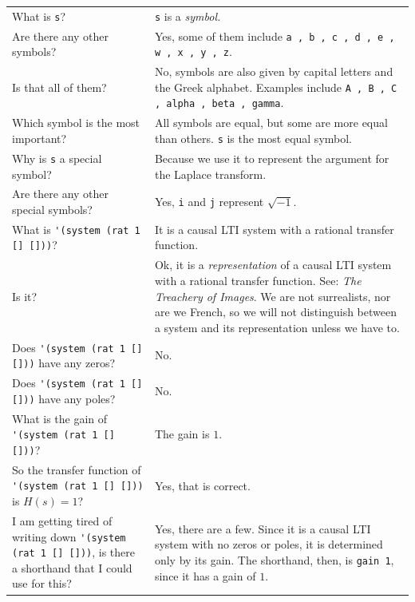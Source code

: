 \documentclass[11pt,letter]{article}
\begin{document}
\begin{longtable}{ p{} p{} }
  \toprule
  \toprule
  What is \lstinline!s!?
  &
  \lstinline!s! is a \emph{symbol.} \\

  Are there any other symbols?
  &
  Yes, some of them include \lstinline!a , b , c , d , e , w , x , y , z!. \\

  Is that all of them?
  &
  No, symbols are also given by capital letters and the Greek alphabet. Examples include \lstinline!A , B , C , alpha , beta , gamma!. \\

  Which symbol is the most important?
  &
  All symbols are equal, but some are more equal than others. \lstinline!s! is the most equal symbol. \\

  Why is \lstinline!s! a special symbol?
  &
  Because we use it to represent the argument for the Laplace transform. \\

  Are there any other special symbols?
  &
  Yes, \lstinline!i! and \lstinline!j! represent $\sqrt{-1}$. \\

  \midrule
  \midrule
  What is \lstinline!'(system (rat 1 [] []))!?
  &
  It is a causal LTI system with a rational transfer function. \\

  Is it?
  &
  Ok, it is a \emph{representation} of a causal LTI system with a rational transfer function.
  See: \emph{The Treachery of Images}.
  We are not surrealists, nor are we French, so we will not distinguish between a system and its representation unless we have to. \\

  Does \lstinline!'(system (rat 1 [] []))! have any zeros?
  &
  No. \\

  Does \lstinline!'(system (rat 1 [] []))! have any poles?
  &
  No. \\

  What is the gain of \lstinline!'(system (rat 1 [] []))!?
  &
  The gain is $1$. \\

  So the transfer function of \lstinline!'(system (rat 1 [] []))! is $H(s)=1$?
  &
  Yes, that is correct. \\

  I am getting tired of writing down \lstinline!'(system (rat 1 [] []))!, is there a shorthand that I could use for this?
  &
  Yes, there are a few.
  Since it is a causal LTI system with no zeros or poles, it is determined only by its gain.
  The shorthand, then, is \lstinline!gain 1!, since it has a gain of $1$. \\


\end{longtable}
\end{document}
